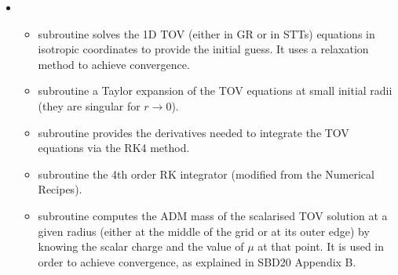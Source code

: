 \documentclass[letterpaper,10pt,english]{sphinxmanual}
\begin{document}
\begin{itemize}
\begin{itemize}
\item {} 
\sphinxAtStartPar
subroutine  \sphinxhyphen{} evaluate A3L \(=\int jd\Omega\)  in the Omega\sphinxhyphen{}space for a differential rotator. This is the parameter the enters the Bernoulli Equation for the differential rotation.

\item {} 
\sphinxAtStartPar
subroutine  evaluate JMAX, XVAL and YVAL (only needed for Uryu Laws, see Franceschetti et al. 2022 A8, A9, A18).

\item {} 
\sphinxAtStartPar
subroutine  \sphinxhyphen{} evaluate FO and DFO in the J\sphinxhyphen{}space for a differential rotator (only needed for Uryu Laws, see Franceschetti et al. 2022 A2, A3).

\item {} 
\sphinxAtStartPar
subroutine  evaluate A3L \(=\int \Omega dj\) in the J\sphinxhyphen{}space for a differential rotator. This is the parameter the enters the Bernoulli Equation for the differential rotation.


\end{itemize}

\item {} 
\sphinxAtStartPar
{}
\begin{itemize}
\item {} 
\sphinxAtStartPar
subroutine  \sphinxhyphen{} solves the 1D TOV (either in GR or in STTs) equations in isotropic coordinates to provide the initial guess. It uses a relaxation method to achieve convergence.

\item {} 
\sphinxAtStartPar
subroutine  \sphinxhyphen{} a Taylor expansion of the TOV equations at small initial radii (they are
singular for \(r \rightarrow 0\)).

\item {} 
\sphinxAtStartPar
subroutine  \sphinxhyphen{} provides the derivatives needed to integrate the TOV equations via the
RK4 method.

\item {} 
\sphinxAtStartPar
subroutine  \sphinxhyphen{} the 4th order RK integrator (modified from the Numerical Recipes).

\item {} 
\sphinxAtStartPar
subroutine  \sphinxhyphen{} computes the ADM mass of the scalarised TOV solution at a given radius (either at the middle of the grid or at its outer edge) by knowing the scalar charge and the value of \(\mu\) at that point. It is used in order to achieve convergence, as explained in SBD20 Appendix B.



\end{itemize}
\end{itemize}
\end{document}

